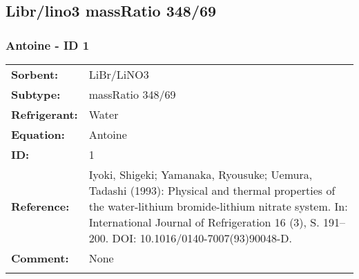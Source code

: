 \subsection{Libr/lino3 massRatio 348/69}
%
\subsubsection{Antoine - ID 1}
%
\begin{tabular}[l]{|lp{11.5cm}|}
\hline
\addlinespace

\textbf{Sorbent:} & LiBr/LiNO3 \\
\textbf{Subtype:} & massRatio 348/69 \\
\textbf{Refrigerant:} & Water  \\
\textbf{Equation:} & Antoine \\
\textbf{ID:} & 1 \\
\textbf{Reference:} & Iyoki, Shigeki; Yamanaka, Ryousuke; Uemura, Tadashi (1993): Physical and thermal properties of the water-lithium bromide-lithium nitrate system. In: International Journal of Refrigeration 16 (3), S. 191–200. DOI: 10.1016/0140-7007(93)90048-D. \\
\textbf{Comment:} & None \\

\addlinespace
\hline
\end{tabular}
\newline

